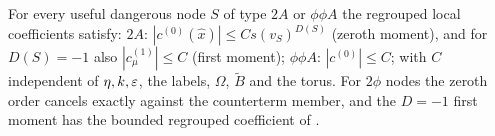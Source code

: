 
\begin{theorem}\label{thm:a06d:S48}
For every useful dangerous node $S$ of type $2A$ or $\phi\phi A$ the regrouped local coefficients satisfy: $2A$: $|c^{(0)}(\hat x)|\le Cs(v_S)^{D(S)}$ (zeroth moment), and for $D(S)=-1$ also $|c^{(1)}_\mu|\le C$ (first moment); $\phi\phi A$: $|c^{(0)}|\le C$; with $C$ independent of $\eta,k,\varepsilon$, the labels, $\Omega$, $\tilde B$ and the torus. For $2\phi$ nodes the zeroth order cancels exactly against the counterterm member, and the $D=-1$ first moment has the bounded regrouped coefficient of \cite[(3.11)]{Ba3}.
\end{theorem}

